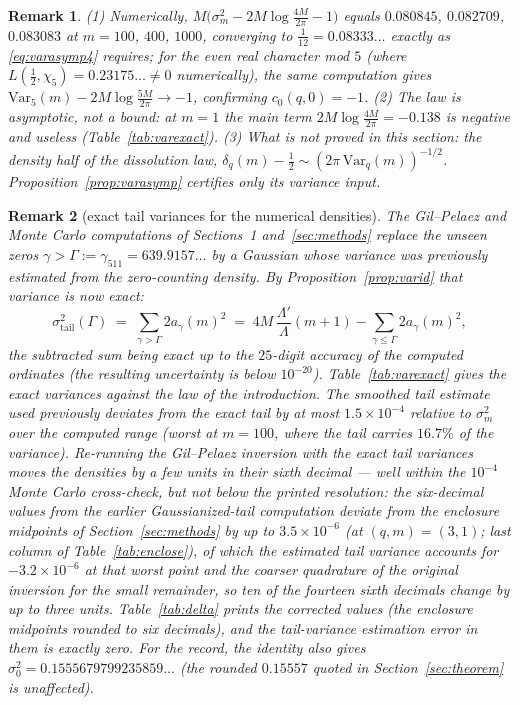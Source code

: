 \documentclass[11pt]{article}
\newtheorem{remark}{Remark}
\begin{document}
\begin{remark}\label{rem:varasymp-numerics}
(1) Numerically, $M\bigl(\sigma_m^2-2M\log\tfrac{4M}{2\pi}-1\bigr)$
equals $0.080845$, $0.082709$, $0.083083$ at $m=100$, $400$, $1000$,
converging to $\tfrac1{12}=0.08333\ldots$ exactly as
\eqref{eq:varasymp4} requires; for the even real character mod $5$
(where $L(\tfrac12,\chi_5)=0.23175\ldots\ne0$ numerically), the same
computation gives
$\mathrm{Var}_5(m)-2M\log\tfrac{5M}{2\pi}\to-1$, confirming
$c_0(q,0)=-1$. (2) The law is asymptotic, not a bound: at $m=1$ the
main term $2M\log\tfrac{4M}{2\pi}=-0.138$ is negative and useless
(Table~\ref{tab:varexact}). (3) What is \emph{not} proved in this
section: the density half of the dissolution law,
$\delta_q(m)-\tfrac12\sim(2\pi\,\mathrm{Var}_q(m))^{-1/2}$.
Proposition~\ref{prop:varasymp} certifies only its variance input.
\end{remark}

\begin{remark}[exact tail variances for the numerical densities]
\label{rem:tails}
The Gil--Pelaez and Monte Carlo computations of
Sections~1 and~\ref{sec:methods} replace the unseen zeros
$\gamma>\Gamma:=\gamma_{511}=639.9157\ldots$ by a Gaussian whose
variance was previously \emph{estimated} from the zero-counting
density. By Proposition~\ref{prop:varid} that variance is now exact:
\[
\sigma^2_{\mathrm{tail}}(\Gamma)
\;=\;\sum_{\gamma>\Gamma}2a_\gamma(m)^2
\;=\;4M\,\frac{\Lambda'}{\Lambda}(m+1)
-\sum_{\gamma\le\Gamma}2a_\gamma(m)^2 ,
\]
the subtracted sum being exact up to the $25$-digit accuracy of the
computed ordinates (the resulting uncertainty is below $10^{-20}$).
Table~\ref{tab:varexact} gives the exact variances against the law of
the introduction. The smoothed tail estimate used previously deviates
from the exact tail by at most $1.5\times10^{-4}$ relative to
$\sigma_m^2$ over the computed range (worst at $m=100$, where the tail
carries $16.7\%$ of the variance). Re-running the Gil--Pelaez
inversion with the exact tail variances moves the densities by a few
units in their sixth decimal --- well within the $10^{-4}$ Monte
Carlo cross-check, but not below the printed resolution: the
six-decimal values from the earlier Gaussianized-tail computation
deviate from the enclosure midpoints of Section~\ref{sec:methods} by
up to $3.5\times10^{-6}$ (at $(q,m)=(3,1)$; last column of
Table~\ref{tab:enclose}), of which the estimated tail variance
accounts for $-3.2\times10^{-6}$ at that worst point and the coarser
quadrature of the original inversion for the small remainder, so ten
of the fourteen sixth decimals change by up to three units.
Table~\ref{tab:delta} prints the corrected values (the enclosure
midpoints rounded to six decimals), and the tail-variance estimation
error in them is exactly zero. For the record, the identity also gives
$\sigma_0^2=0.1555679799235859\ldots$ (the rounded $0.15557$ quoted in
Section~\ref{sec:theorem} is unaffected).
\end{remark}
\end{document}
